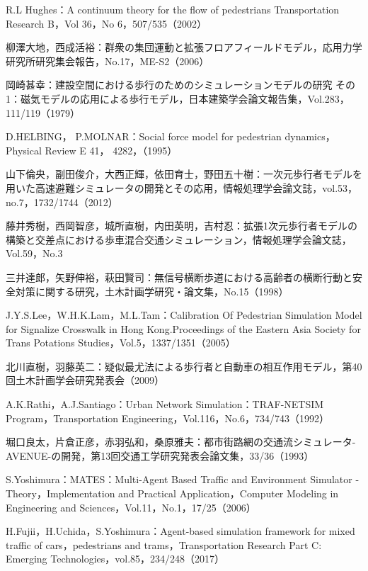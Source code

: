 \begin{thebibliography}{99}
  R.L Hughes：A continuum theory for the flow of pedestrians Transportation Research B，Vol 36，No 6，507/535（2002）

  柳澤大地，西成活裕：群衆の集団運動と拡張フロアフィールドモデル，応用力学研究所研究集会報告，No.17，ME-S2（2006）

  岡崎甚幸：建設空間における歩行のためのシミュレーションモデルの研究 その1：磁気モデルの応用による歩行モデル，日本建築学会論文報告集，Vol.283，111/119（1979）

  D.HELBING， P.MOLNAR：Social force model for pedestrian dynamics， Physical Review E 41， 4282，（1995）

  山下倫央，副田俊介，大西正輝，依田育士，野田五十樹：一次元歩行者モデルを用いた高速避難シミュレータの開発とその応用，情報処理学会論文誌，vol.53，no.7，1732/1744（2012）

  藤井秀樹，西岡智彦，城所直樹，内田英明，吉村忍：拡張1次元歩行者モデルの構築と交差点における歩車混合交通シミュレーション，情報処理学会論文誌，Vol.59，No.3

  三井達郎，矢野伸裕，萩田賢司：無信号横断歩道における高齢者の横断行動と安全対策に関する研究，土木計画学研究・論文集，No.15（1998）

  J.Y.S.Lee，W.H.K.Lam，M.L.Tam：Calibration Of Pedestrian Simulation Model for Signalize Crosswalk in Hong Kong.Proceedings of the Eastern Asia Society for Trans Potations Studies，Vol.5，1337/1351（2005）

  北川直樹，羽藤英二：疑似最尤法による歩行者と自動車の相互作用モデル，第40回土木計画学会研究発表会（2009）

  A.K.Rathi，A.J.Santiago：Urban Network Simulation：TRAF-NETSIM Program，Transportation Engineering，Vol.116，No.6，734/743（1992）

  堀口良太，片倉正彦，赤羽弘和，桑原雅夫：都市街路網の交通流シミュレータ-AVENUE-の開発，第13回交通工学研究発表会論文集，33/36（1993）

  S.Yoshimura：MATES：Multi-Agent Based Traffic and Environment Simulator - Theory，Implementation and Practical Application，Computer Modeling in Engineering and Sciences，Vol.11，No.1，17/25（2006）

  H.Fujii，H.Uchida，S.Yoshimura：Agent-based simulation framework for mixed traffic of cars，pedestrians and trams，Transportation Research Part C: Emerging Technologies，vol.85，234/248（2017）


\end{thebibliography}
